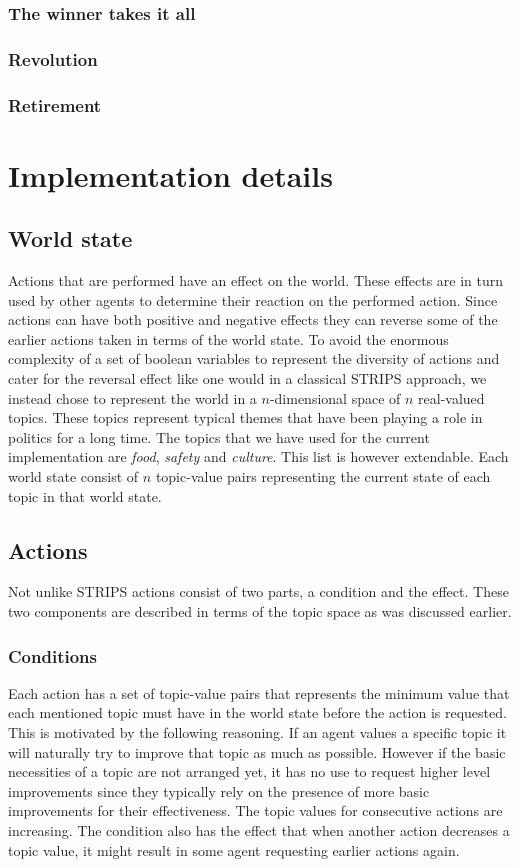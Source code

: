 \documentclass[11pt,a4paper]{article}
\begin{document}
  \subsubsection{The winner takes it all}
  \subsubsection{Revolution}
  \subsubsection{Retirement}
  

\section{Implementation details}
  \subsection{World state}
    Actions that are performed have an effect on the world. These effects are in turn used by other agents to determine their reaction on the performed action. Since actions can have both positive and negative effects they can reverse some of the earlier actions taken in terms of the world state. To avoid the enormous complexity of a set of boolean variables to represent the diversity of actions and cater for the reversal effect like one would in a classical STRIPS approach, we instead chose to represent the world in a $n$-dimensional space of $n$ real-valued topics. These topics represent typical themes that have been playing a role in politics for a long time. The topics that we have used for the current implementation are \emph{food}, \emph{safety} and \emph{culture}. This list is however extendable. Each world state consist of $n$ topic-value pairs representing the current state of each topic in that world state.
  \subsection{Actions}
    Not unlike STRIPS actions consist of two parts, a condition and the effect. These two components are described in terms of the topic space as was discussed earlier.
    \subsubsection{Conditions}
      Each action has a set of topic-value pairs that represents the minimum value that each mentioned topic must have in the world state before the action is requested. This is motivated by the following reasoning. If an agent values a specific topic it will naturally try to improve that topic as much as possible. However if the basic necessities of a topic are not arranged yet, it has no use to request higher level improvements since they typically rely on the presence of more basic improvements for their effectiveness. The topic values for consecutive actions are increasing. The condition also has the effect that when another action decreases a topic value, it might result in some agent requesting earlier actions again.
\end{document}
